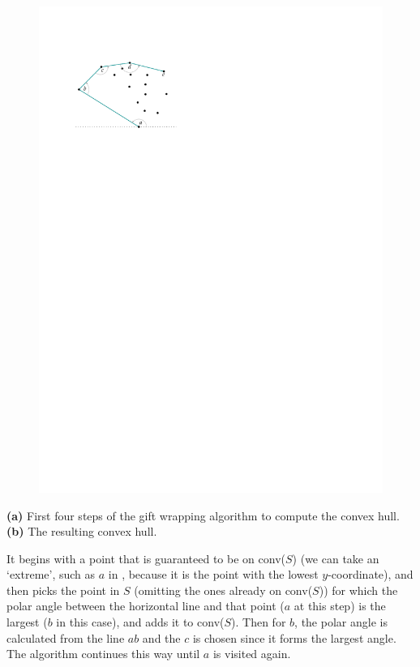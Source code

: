 \begin{marginfigure}
\begin{subfigure}[b]{\linewidth}
    \includegraphics[page=2,width=\textwidth]{figs/giftwrapping.pdf}
    \caption{}
  \end{subfigure}
  \caption{\textbf{(a)} First four steps of the gift wrapping algorithm to compute the convex hull. \textbf{(b)} The resulting convex hull.}%
\end{marginfigure}
It begins with a point that is guaranteed to be on conv($S$) (we can take an `extreme', such as $a$ in , because it is the point with the lowest $y$-coordinate), and then picks the point in $S$ (omitting the ones already on conv($S$)) for which the polar angle between the horizontal line and that point ($a$ at this step) is the largest ($b$ in this case), and adds it to conv($S$).
Then for $b$, the polar angle is calculated from the line $ab$ and the $c$ is chosen since it forms the largest angle.
The algorithm continues this way until $a$ is visited again.

